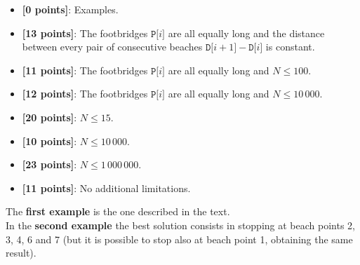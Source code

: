 \begin{itemize}[nolistsep,itemsep=2mm]
  \item \textbf{ [\phantom{1}0 points]}: Examples.
  \item \textbf{ [13 points]}: The footbridges $\texttt{P[$i$]}$ are all equally long and the distance between every pair of consecutive beaches $\texttt{D[$i+1$]} - \texttt{D[$i$]}$ is constant.
  \item \textbf{ [11 points]}: The footbridges $\texttt{P[$i$]}$ are all equally long and $N \leq 100$.
  \item \textbf{ [12 points]}: The footbridges $\texttt{P[$i$]}$ are all equally long and $N \leq 10\,000$.
  \item \textbf{ [20 points]}: $N \leq 15$.
  \item \textbf{ [10 points]}: $N \leq 10\,000$.
  \item \textbf{ [23 points]}: $N \leq 1\,000\,000$.
  \item \textbf{ [11 points]}: No additional limitations.
\end{itemize}



\Examples

\begin{example}
%
%
\end{example}



\Explanation

The \textbf{first example} is the one described in the text.\\[2mm]
In the \textbf{second example} the best solution consists in stopping at beach points 2, 3, 4, 6 and 7 (but it is possible to stop also at beach point 1, obtaining the same result).

\begin{solution}
	
\end{solution}
